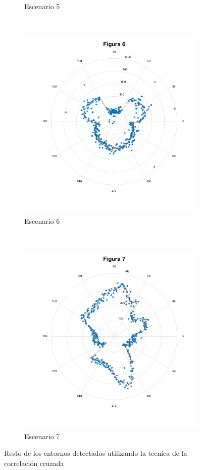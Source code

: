 \documentclass[letterpaper,11pt]{article}
\begin{document}
\begin{figure}[H]
\begin{subfigure}[b]{0.45\textwidth}
        \caption{Escenario 5}
    \end{subfigure}
    ~
    \begin{subfigure}[b]{0.45\textwidth}
        \includegraphics[width=\textwidth]{img/parte_b/figura6.png}
        \caption{Escenario 6}
    \end{subfigure}
    ~
    \begin{subfigure}[b]{0.45\textwidth}
        \includegraphics[width=\textwidth]{img/parte_b/figura7.png}
        \caption{Escenario 7}
    \end{subfigure}
    \caption{Resto de los entornos detectados utilizando la tecnica de la correlación cruzada}   
    \label{parteb2}
\end{figure}
   
\end{document}
